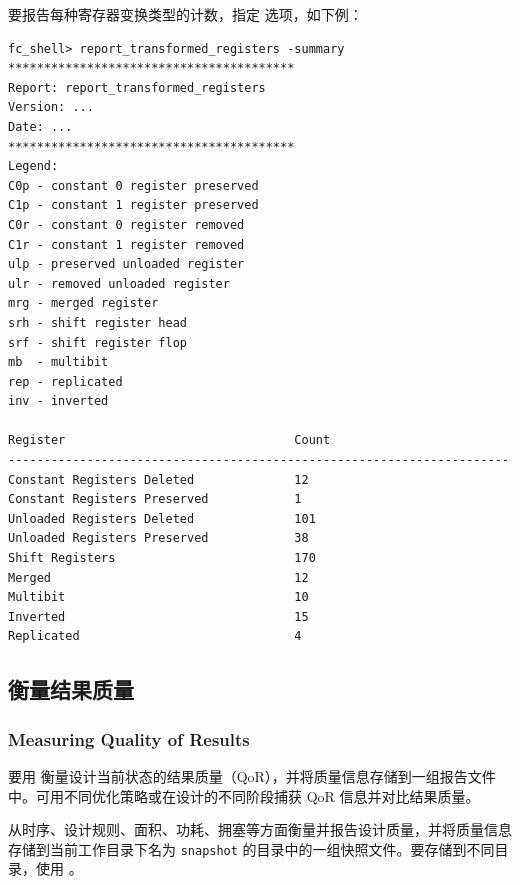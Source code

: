 要报告每种寄存器变换类型的计数，指定  选项，如下例：
\begin{lstlisting}
fc_shell> report_transformed_registers -summary
****************************************
Report: report_transformed_registers
Version: ...
Date: ...
****************************************
Legend:
C0p - constant 0 register preserved
C1p - constant 1 register preserved
C0r - constant 0 register removed
C1r - constant 1 register removed
ulp - preserved unloaded register
ulr - removed unloaded register
mrg - merged register
srh - shift register head
srf - shift register flop
mb  - multibit
rep - replicated
inv - inverted

Register                                Count
----------------------------------------------------------------------
Constant Registers Deleted              12
Constant Registers Preserved            1
Unloaded Registers Deleted              101
Unloaded Registers Preserved            38
Shift Registers                         170
Merged                                  12
Multibit                                10
Inverted                                15
Replicated                              4
\end{lstlisting}

\subsection{衡量结果质量}
\subsubsection*{Measuring Quality of Results}

要用  衡量设计当前状态的结果质量（QoR），并将质量信息存储到一组报告文件中。可用不同优化策略或在设计的不同阶段捕获 QoR 信息并对比结果质量。

 从时序、设计规则、面积、功耗、拥塞等方面衡量并报告设计质量，并将质量信息存储到当前工作目录下名为 \texttt{snapshot} 的目录中的一组快照文件。要存储到不同目录，使用 。

